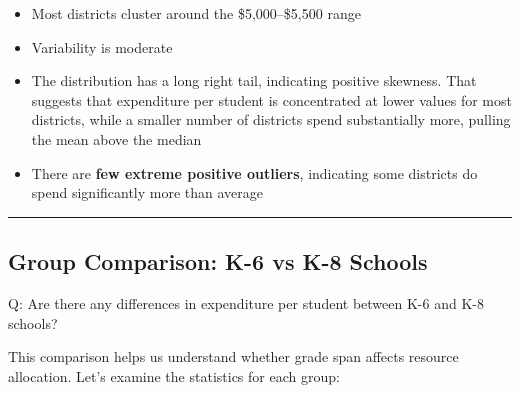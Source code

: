 \documentclass[
  12pt,
  a4paper,
]{scrbook}
\newenvironment{Shaded}{\begin{snugshade}}{\end{snugshade}}
\newcommand{\AttributeTok}[1]{\textcolor[rgb]{0.40,0.45,0.13}{#1}}
\newcommand{\CommentTok}[1]{\textcolor[rgb]{0.37,0.37,0.37}{#1}}
\newcommand{\ConstantTok}[1]{\textcolor[rgb]{0.56,0.35,0.01}{#1}}
\newcommand{\FunctionTok}[1]{\textcolor[rgb]{0.28,0.35,0.67}{#1}}
\newcommand{\NormalTok}[1]{\textcolor[rgb]{0.00,0.23,0.31}{#1}}
\newcommand{\OtherTok}[1]{\textcolor[rgb]{0.00,0.23,0.31}{#1}}
\newcommand{\SpecialCharTok}[1]{\textcolor[rgb]{0.37,0.37,0.37}{#1}}
\providecommand{\tightlist}{%
  \setlength{\itemsep}{0pt}\setlength{\parskip}{0pt}}
\renewcommand{\tightlist}{\setlength{\itemsep}{0.5\baselineskip}\setlength{\parskip}{0.2\baselineskip}}
\theoremstyle{plain}
\theoremstyle{definition}
\theoremstyle{remark}
\begin{document}
\begin{itemize}
\tightlist
\item
  Most districts cluster around the {\$5,000}--{\$5,500} range
\item
  Variability is moderate
\item
  The distribution has a long right tail, indicating positive skewness.
  That suggests that expenditure per student is concentrated at lower
  values for most districts, while a smaller number of districts spend
  substantially more, pulling the mean above the median
\item
  There are \textbf{few extreme positive outliers}, indicating some
  districts do spend significantly more than average
\end{itemize}

\begin{center}\rule{0.5\linewidth}{0.5pt}\end{center}

\subsection{Group Comparison: K-6 vs K-8
Schools}\label{group-comparison-k-6-vs-k-8-schools}

Q: Are there any differences in expenditure per student between K-6 and
K-8 schools?

This comparison helps us understand whether grade span affects resource
allocation. Let's examine the statistics for each group:

\begin{Shaded}
\end{Shaded}
\end{document}
